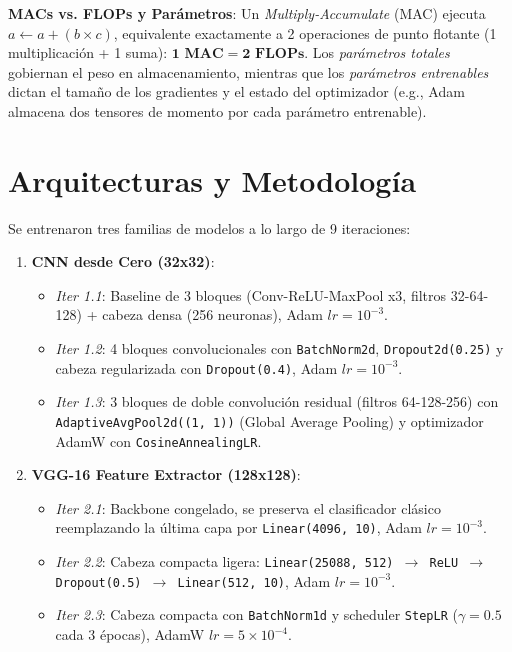 \documentclass[10pt,twocolumn,a4paper]{article}
\begin{document}
\textbf{MACs vs. FLOPs y Parámetros}: Un \textit{Multiply-Accumulate} (MAC) ejecuta $a \leftarrow a + (b \times c)$, equivalente exactamente a 2 operaciones de punto flotante (1 multiplicación + 1 suma): $\mathbf{1\text{ MAC} = 2\text{ FLOPs}}$. Los \textit{parámetros totales} gobiernan el peso en almacenamiento, mientras que los \textit{parámetros entrenables} dictan el tamaño de los gradientes y el estado del optimizador (e.g., Adam almacena dos tensores de momento por cada parámetro entrenable).

\section{Arquitecturas y Metodología}
Se entrenaron tres familias de modelos a lo largo de 9 iteraciones:
\begin{enumerate}\setlength\itemsep{0em}
    \item \textbf{CNN desde Cero (32x32)}:
    \begin{itemize}\setlength\itemsep{0em}
        \item \textit{Iter 1.1}: Baseline de 3 bloques (Conv-ReLU-MaxPool x3, filtros 32-64-128) + cabeza densa (256 neuronas), Adam $lr=10^{-3}$.
        \item \textit{Iter 1.2}: 4 bloques convolucionales con \texttt{BatchNorm2d}, \texttt{Dropout2d(0.25)} y cabeza regularizada con \texttt{Dropout(0.4)}, Adam $lr=10^{-3}$.
        \item \textit{Iter 1.3}: 3 bloques de doble convolución residual (filtros 64-128-256) con \texttt{AdaptiveAvgPool2d((1, 1))} (Global Average Pooling) y optimizador AdamW con \texttt{CosineAnnealingLR}.
    \end{itemize}
    \item \textbf{VGG-16 Feature Extractor (128x128)}:
    \begin{itemize}\setlength\itemsep{0em}
        \item \textit{Iter 2.1}: Backbone congelado, se preserva el clasificador clásico reemplazando la última capa por \texttt{Linear(4096, 10)}, Adam $lr=10^{-3}$.
        \item \textit{Iter 2.2}: Cabeza compacta ligera: \texttt{Linear(25088, 512) $\to$ ReLU $\to$ Dropout(0.5) $\to$ Linear(512, 10)}, Adam $lr=10^{-3}$.
        \item \textit{Iter 2.3}: Cabeza compacta con \texttt{BatchNorm1d} y scheduler \texttt{StepLR} ($\gamma=0.5$ cada 3 épocas), AdamW $lr=5\times 10^{-4}$.
    \end{itemize}

\end{enumerate}
\end{document}
